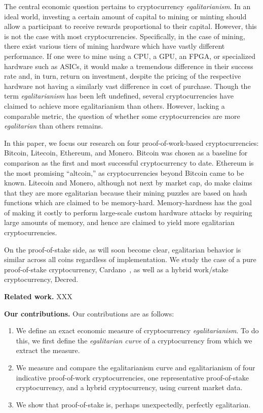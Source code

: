 The central economic question pertains to cryptocurrency \emph{egalitarianism}.
In an ideal world, investing a certain amount of capital to mining or minting
should allow a participant to receive rewards proportional to their capital.
However, this is not the case with most cryptocurrencies. Specifically, in
the case of mining, there exist various tiers of mining hardware which have
vastly different performance. If one were to mine using a CPU, a GPU, an FPGA,
or specialized hardware such as ASICs, it would make a tremendous difference in
their success rate and, in turn, return on investment, despite the pricing of
the respective hardware not having a similarly vast difference in cost of
purchase. Though the term \emph{egalitarianism} has been left undefined, several
cryptocurrencies have claimed to achieve more egalitarianism than others.
However, lacking a comparable metric, the question of whether some
cryptocurrencies are more \emph{egalitarian} than others remains.

In this paper, we focus our research on four proof-of-work-based
cryptocurrencies: Bitcoin, Litecoin, Ethereum, and Monero. Bitcoin was chosen as
a baseline for comparison as the first and most successful cryptocurrency to
date. Ethereum is the most promising ``altcoin,'' as cryptocurrencies beyond
Bitcoin came to be known. Litecoin and Monero, although not next by market cap,
do make claims that they are more egalitarian because their mining puzzles are
based on hash functions which are claimed to be memory-hard. Memory-hardness
has the goal of making it costly to perform large-scale custom hardware attacks
by requiring large amounts of memory, and hence are claimed to yield more
egalitarian cryptocurrencies.

On the proof-of-stake side, as will soon become clear, egalitarian behavior is
similar across all coins regardless of implementation. We study the case of a
pure proof-of-stake cryptocurrency, Cardano~\cite{C:KRDO17}, as well as a hybrid
work/stake cryptocurrency, Decred.

\noindent
\textbf{Related work.} XXX

\noindent
\textbf{Our contributions.}
Our contributions are as follows:

\begin{enumerate}
  \item We define an exact economic measure of cryptocurrency
        \emph{egalitarianism}.
        To do this, we first define the \emph{egalitarian curve} of a
        cryptocurrency from which we extract the measure.
  \item We measure and compare the egalitarianism curve and egalitarianism of
        four indicative proof-of-work cryptocurrencies, one representative
        proof-of-stake cryptocurrency, and a hybrid cryptocurrency, using
        current market data.
  \item We show that proof-of-stake is, perhaps unexpectedly, perfectly
        egalitarian.
\end{enumerate}
